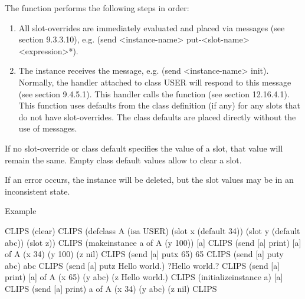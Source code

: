 \documentclass[letterpaper,10pt,english]{sphinxmanual}
\begin{document}

\begin{sphinxVerbatim}[commandchars=\\\{\}]
  
\end{sphinxVerbatim}

The  function performs the following steps in
order:
\begin{enumerate}
\def\theenumi{\arabic{enumi}}
\def\labelenumi{\theenumi .}
\makeatletter\def\p@enumii{\p@enumi \theenumi .}\makeatother
\item {} 
All slot-overrides are immediately evaluated and placed via 
messages (see section 9.3.3.10), e.g. (send \textless{}instance-name\textgreater{}
put-\textless{}slot-name\textgreater{} \textless{}expression\textgreater{}*).

\item {} 
The instance receives the  message, e.g. (send
\textless{}instance-name\textgreater{} init). Normally, the handler attached to class USER will
respond to this message (see section 9.4.5.1). This handler calls the
 function (see section 12.16.4.1). This function uses
defaults from the class definition (if any) for any slots that do not
have slot-overrides. The class defaults are placed directly without the
use of messages.

\end{enumerate}

If no slot-override or class default specifies the value of a slot, that
value will remain the same. Empty class default values allow
 to clear a slot.

If an error occurs, the instance will  be deleted, but the slot
values may be in an inconsistent state.

Example

\begin{sphinxVerbatim}[commandchars=\\\{\}]
CLIPS\PYGZgt{} (clear)
CLIPS\PYGZgt{}
(defclass A (is\PYGZhy{}a USER)
  (slot x (default 34))
  (slot y (default abc))
  (slot z))
CLIPS\PYGZgt{} (make\PYGZhy{}instance a of A (y 100))
[a]
CLIPS\PYGZgt{} (send [a] print)
[a] of A
(x 34)
(y 100)
(z nil)
CLIPS\PYGZgt{} (send [a] put\PYGZhy{}x 65)
65
CLIPS\PYGZgt{} (send [a] put\PYGZhy{}y abc)
abc
CLIPS\PYGZgt{} (send [a] put\PYGZhy{}z \PYGZdq{}Hello world.\PYGZdq{})
?Hello world.?
CLIPS\PYGZgt{} (send [a] print)
[a] of A
(x 65)
(y abc)
(z \PYGZdq{}Hello world.\PYGZdq{})
CLIPS\PYGZgt{} (initialize\PYGZhy{}instance a)
[a]
CLIPS\PYGZgt{} (send [a] print)
a of A
(x 34)
(y abc)
(z nil)
CLIPS\PYGZgt{}
\end{sphinxVerbatim}
\end{document}
